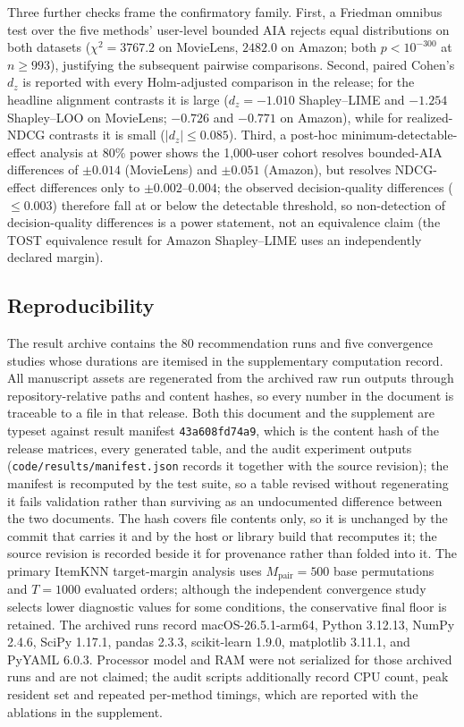\documentclass[manuscript,screen,review,anonymous]{acmart}
\newcommand{\resultmanifeststamp}{43a608fd74a9}
\begin{document}
Three further checks frame the confirmatory family. First, a Friedman omnibus test over the five methods' user-level bounded AIA rejects equal distributions on both datasets ($\chi^2=3767.2$ on MovieLens, $2482.0$ on Amazon; both $p<10^{-300}$ at $n\ge993$), justifying the subsequent pairwise comparisons. Second, paired Cohen's $d_z$ is reported with every Holm-adjusted comparison in the release; for the headline alignment contrasts it is large ($d_z=-1.010$ Shapley--LIME and $-1.254$ Shapley--LOO on MovieLens; $-0.726$ and $-0.771$ on Amazon), while for realized-NDCG contrasts it is small ($|d_z|\le0.085$). Third, a post-hoc minimum-detectable-effect analysis at 80\% power shows the 1,000-user cohort resolves bounded-AIA differences of $\pm0.014$ (MovieLens) and $\pm0.051$ (Amazon), but resolves NDCG-effect differences only to $\pm0.002$--$0.004$; the observed decision-quality differences ($\le0.003$) therefore fall at or below the detectable threshold, so non-detection of decision-quality differences is a power statement, not an equivalence claim (the TOST equivalence result for Amazon Shapley--LIME uses an independently declared margin).

\subsection{Reproducibility}
The result archive contains the 80 recommendation runs and five convergence studies whose durations are itemised in the supplementary computation record. All manuscript assets are regenerated from the archived raw run outputs through repository-relative paths and content hashes, so every number in the document is traceable to a file in that release. Both this document and the supplement are typeset against result manifest \texttt{\resultmanifeststamp}, which is the content hash of the release matrices, every generated table, and the audit experiment outputs (\texttt{code/results/manifest.json} records it together with the source revision); the manifest is recomputed by the test suite, so a table revised without regenerating it fails validation rather than surviving as an undocumented difference between the two documents. The hash covers file contents only, so it is unchanged by the commit that carries it and by the host or library build that recomputes it; the source revision is recorded beside it for provenance rather than folded into it. The primary ItemKNN target-margin analysis uses $M_{\mathrm{pair}}=500$ base permutations and $T=1000$ evaluated orders; although the independent convergence study selects lower diagnostic values for some conditions, the conservative final floor is retained. The archived runs record macOS-26.5.1-arm64, Python 3.12.13, NumPy 2.4.6, SciPy 1.17.1, pandas 2.3.3, scikit-learn 1.9.0, matplotlib 3.11.1, and PyYAML 6.0.3. Processor model and RAM were not serialized for those archived runs and are not claimed; the audit scripts additionally record CPU count, peak resident set and repeated per-method timings, which are reported with the ablations in the supplement.
\end{document}
